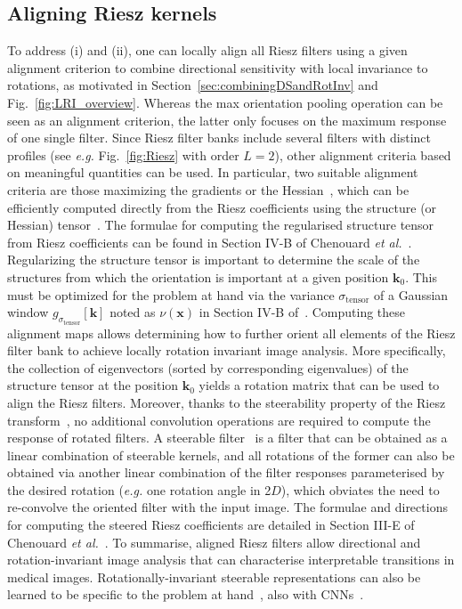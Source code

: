 \documentclass[fleqn,a4paper,oneside,openany]{book}
\begin{document}
\subsection{Aligning Riesz kernels}
To address (i) and (ii), one can locally align all Riesz filters using a given alignment criterion to combine directional sensitivity with local invariance to rotations, as motivated in Section~\ref{sec:combiningDSandRotInv} and Fig.~\ref{fig:LRI_overview}.
Whereas the max orientation pooling operation can be seen as an alignment criterion, the latter only focuses on the maximum response of one single filter.
Since Riesz filter banks include several filters with distinct profiles (see \textit{e.g.} Fig.~\ref{fig:Riesz} with order $L=2$), other alignment criteria based on meaningful quantities can be used.
In particular, two suitable alignment criteria are those maximizing the gradients or the Hessian~\cite{DMP2017}, which can be efficiently computed directly from the Riesz coefficients using the structure (or Hessian) tensor~\cite{ChU2012}.
The formulae for computing the regularised structure tensor from Riesz coefficients can be found in Section IV-B of Chenouard \textit{et al.}~\cite{ChU2012}.
Regularizing the structure tensor is important to determine the scale of the structures from which the orientation is important at a given position $\boldsymbol{k}_0$.
This must be optimized for the problem at hand via the variance $\sigma_{\text{tensor}}$ of a Gaussian window $g_{\sigma_{\text{tensor}}}[\boldsymbol{k}]$ noted as $\nu(\boldsymbol{x})$ in Section IV-B of~\cite{ChU2012}.
Computing these alignment maps allows determining how to further orient all elements of the Riesz filter bank to achieve locally rotation invariant image analysis.
More specifically, the collection of eigenvectors (sorted by corresponding eigenvalues) of the structure tensor at the position $\boldsymbol{k}_0$ yields a rotation matrix that can be used to align the Riesz filters. 
Moreover, thanks to the steerability property of the Riesz transform~\cite{UnV2010}, no additional convolution operations are required to compute the response of rotated filters.
A steerable filter~\cite{FrA1991} is a filter that can be obtained as a linear combination of steerable kernels, and all rotations of the former can also be obtained via another linear combination of the filter responses parameterised by the desired rotation (\textit{e.g.} one rotation angle in 2$D$), which obviates the need to re-convolve the oriented filter with the input image.
The formulae and directions for computing the steered Riesz coefficients are detailed in Section III-E of Chenouard \textit{et al.}~\cite{ChU2012}.
To summarise, aligned Riesz filters allow directional and rotation-invariant image analysis that can characterise interpretable transitions in medical images.
Rotationally-invariant steerable representations can also be learned to be specific to the problem at hand~\cite{Depeursinge2017,AFO2019}, also with CNNs~\cite{AFO2019,AFO2019b,WHS2018,Winkels2019,Weiler2018,bekkers2018roto}.
\end{document}
